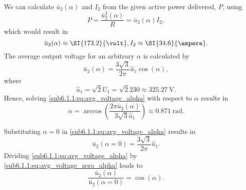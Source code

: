     \begin{solutionblock}
        We can calculate $\bar{u}_\mathrm{2}(\alpha)$ and $I_\mathrm{2}$ from the given active power delivered, $P$, using
        \begin{equation} 
            P = \frac{\bar{u}^2_\mathrm{2}(\alpha)}{R} = \bar{u}_\mathrm{2}(\alpha) I_\mathrm{2},
            \label{sub6.1.1:eq:Active_power_formula}
        \end{equation}
    which would result in 
        \begin{equation}
            \bar{u}_\mathrm{2}(\alpha) \approx \SI{173.2}{\volt},\\
            I_\mathrm{2} \approx \SI{34.6}{\ampere}.
        \end{equation}
        The average output voltage for an arbitrary $\alpha$ is calculated by
        \begin{equation}
            \bar{u}_\mathrm{2}(\alpha) = \frac{3\sqrt{3}}{2\pi}\hat{u}_\mathrm{1}\cos(\alpha),
            \label{sub6.1.1:eq:avg_voltage_alpha}
        \end{equation}
        where
        \begin{equation}
            \hat{u}_\mathrm{1} = \sqrt{2}U_\mathrm{1} = \sqrt{2} 230 \approx \SI{325.27}{\volt}.
            \label{sub6.1.1:eq:voltage_amplitude}
    \end{equation}
    Hence, 
    solving \eqref{sub6.1.1:eq:avg_voltage_alpha} with respect to $\alpha$ results in
        \begin{equation}
            \alpha = \arccos\left(\frac{ 2\pi\bar{u}_\mathrm{2}(\alpha)}{3\sqrt{3}\hat{u}_\mathrm{1}}\right) \approx \SI{0.871}{\radian}.
            \label{sub6.1.1:eq:calculate_alpha}
        \end{equation}    
    
    \end{solutionblock}
    \begin{solutionblock}
        Substituting $\alpha = 0$ in \eqref{sub6.1.1:eq:avg_voltage_alpha} results in
        \begin{equation}
            \bar{u}_\mathrm{2}(\alpha=0) = \frac{3\sqrt{3}}{2\pi}\hat{u}_\mathrm{1}.
            \label{sub6.1.1:eq:avg_voltage_zero_alpha}
        \end{equation}
        Dividing \eqref{sub6.1.1:eq:avg_voltage_alpha} by \eqref{sub6.1.1:eq:avg_voltage_zero_alpha} leads to  
        \begin{equation}
            \frac{ \bar{u}_\mathrm{2}(\alpha)}{\bar{u}_\mathrm{2}(\alpha=0)} = \cos(\alpha).
            \label{sub6.1.1:eq:voltages_relation}
        \end{equation}    
        
    \end{solutionblock}
